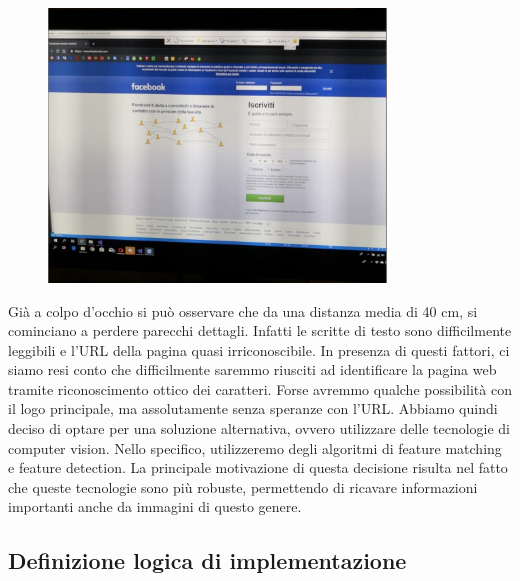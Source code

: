 \documentclass[twoside]{supsistudent}
\newcommand{\Decaa}{\newline\vspace{0.5mm}\newline\noindent}
\begin{document}
\begin{figure}[h!]
  \centering
    \includegraphics[width=0.8\textwidth]{Pictures/imageToFindTrim.png}
\end{figure}
\newline
Già a colpo d'occhio si può osservare che da una distanza media di 40 cm, si cominciano a perdere parecchi dettagli. Infatti le scritte di testo sono difficilmente leggibili e l'URL della pagina quasi irriconoscibile.
\Decaa
In presenza di questi fattori, ci siamo resi conto che difficilmente saremmo riusciti ad identificare la pagina web tramite riconoscimento ottico dei caratteri. Forse avremmo qualche possibilità con il logo principale, ma assolutamente senza speranze con l'URL.
\Decaa
Abbiamo quindi deciso di optare per una soluzione alternativa, ovvero utilizzare delle tecnologie di computer vision. Nello specifico, utilizzeremo degli algoritmi di feature matching e feature detection. La principale motivazione di questa decisione risulta nel fatto che queste tecnologie sono più robuste, permettendo di ricavare informazioni importanti anche da immagini di questo genere.

\subsection{Definizione logica di implementazione}
\end{document}
